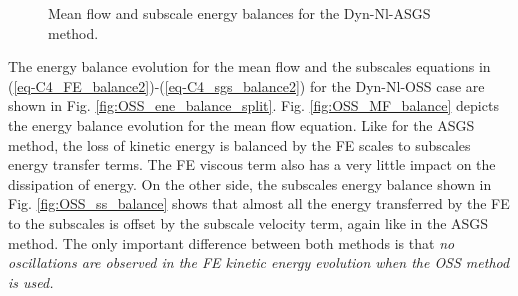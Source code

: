 \begin{figure}[h!]
  \centering
  \caption{Mean flow and subscale energy balances for the Dyn-Nl-ASGS method.}
  \label{fig:ASGS_ene_balance_split}
\end{figure}


The energy balance evolution for the mean flow and the subscales equations in (\ref{eq-C4_FE_balance2})-(\ref{eq-C4_sgs_balance2}) for the Dyn-Nl-OSS case are shown in Fig. \ref{fig:OSS_ene_balance_split}. Fig. \ref{fig:OSS_MF_balance} depicts the energy balance evolution for the mean flow equation. Like for the ASGS method, the loss of kinetic energy is balanced by the FE scales to subscales energy transfer terms. The FE viscous term also has a very little impact on the dissipation of energy. On the other side, the subscales energy balance shown in Fig. \ref{fig:OSS_ss_balance} shows that almost all the energy transferred by the FE to the subscales is offset by the subscale velocity term,
again like in the ASGS method.
The only important difference between both methods is that \emph{no oscillations are observed in the FE kinetic energy evolution when the OSS method is used.}

